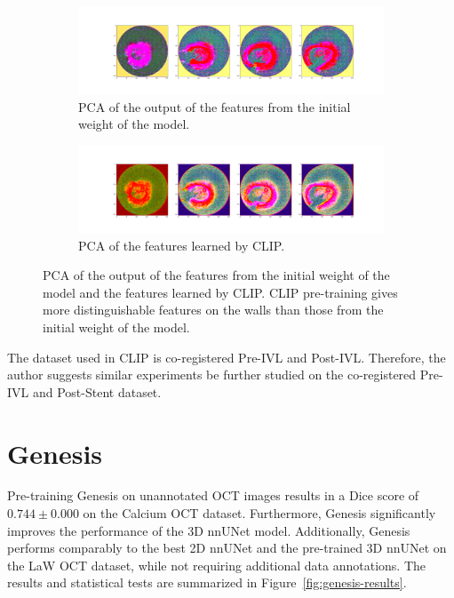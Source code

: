 \documentclass[a4paper,11pt,oneside]{report}
\begin{document}
\begin{figure}[h]
    \centering
    \begin{subfigure}[t]{0.5\textwidth}
        \centering
        \includegraphics[width=\linewidth]{figures/discussion_default_feature_map_batch0_feature1.png}
        \caption{PCA of the output of the features from the initial weight of the model.}
        \label{fig:pca-initial}
    \end{subfigure}%
    \begin{subfigure}[t]{0.5\textwidth}
        \centering
        \includegraphics[width=\linewidth]{figures/discussion_clip_feature_map_batch0_feature1.png}
        \caption{PCA of the features learned by CLIP.}
        \label{fig:pca-clip}
        
    \end{subfigure}
    \caption{PCA of the output of the features from the initial weight of the model and the features learned by CLIP. CLIP pre-training gives more distinguishable features on the walls than those from the initial weight of the model. 
    }
\end{figure}

The dataset used in CLIP is co-registered Pre-IVL and Post-IVL. Therefore, the author suggests similar experiments be further studied on the co-registered Pre-IVL and Post-Stent dataset.

\section{Genesis}
Pre-training Genesis on unannotated OCT images results in a Dice score of $0.744\pm0.000$ on the Calcium OCT dataset. Furthermore, Genesis significantly improves the performance of the 3D nnUNet model. Additionally, Genesis performs comparably to the best 2D nnUNet and the pre-trained 3D nnUNet on the LaW OCT dataset, while not requiring additional data annotations. The results and statistical tests are summarized in Figure~\ref{fig:genesis-results}.
\end{document}
